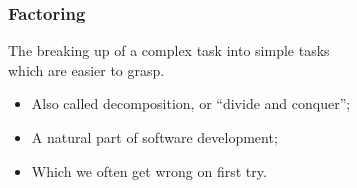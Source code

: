 \begin{frame}

\frametitle{Factoring}

\vspace{\fill}

\begin{center}

The breaking up of a complex task into simple tasks \\ which are easier to
grasp.

\end{center}

\vspace{\fill}

\begin{itemize}

\item Also called decomposition, or ``divide and conquer'';

\item A natural part of software development;

\item Which we often get wrong on first try.

\end{itemize}

\end{frame}
